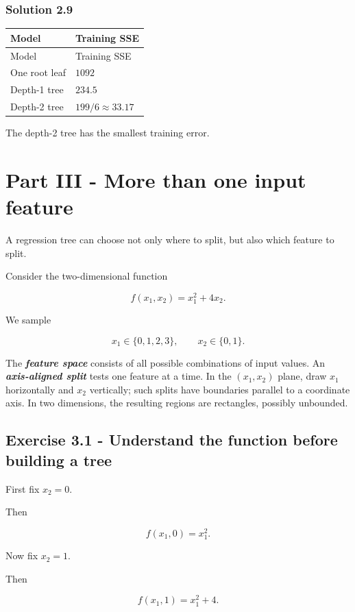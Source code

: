 \documentclass[10pt]{article}
\begin{document}
\begingroup\color{red}

\subsubsection*{Solution 2.9}
\begingroup
\small
\setlength{\tabcolsep}{4pt}
\begin{longtable}{l|l}
Model & Training SSE \\
\hline
\endfirsthead
Model & Training SSE \\
\hline
\endhead
One root leaf & $1092$ \\[1.5pt]
Depth-1 tree & $234.5$ \\[1.5pt]
Depth-2 tree & $199/6\approx33.17$ \\[1.5pt]
\end{longtable}
\endgroup
The depth-2 tree has the smallest training error.

\par\endgroup

\clearpage
\section*{Part III - More than one input feature}
A regression tree can choose not only where to split, but also which feature to split.

Consider the two-dimensional function

\[
f(x_1,x_2)=x_1^2+4x_2.
\]

We sample

\[
x_1\in\{0,1,2,3\},
\qquad
x_2\in\{0,1\}.
\]

The \textbf{\textit{feature space}} consists of all possible combinations of input values. An \textbf{\textit{axis-aligned split}} tests one feature at a time. In the $(x_1,x_2)$ plane, draw $x_1$ horizontally and $x_2$ vertically; such splits have boundaries parallel to a coordinate axis. In two dimensions, the resulting regions are rectangles, possibly unbounded.

\subsection*{Exercise 3.1 - Understand the function before building a tree}
First fix $x_2=0$.

Then

\[
f(x_1,0)=x_1^2.
\]

Now fix $x_2=1$.

Then

\[
f(x_1,1)=x_1^2+4.
\]
\end{document}
